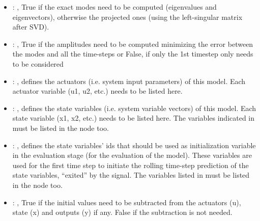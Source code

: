 \begin{itemize}
    \item {}: , 
      True if the exact modes need to be computed (eigenvalues and
      eigenvectors),   otherwise the projected ones (using the left-singular matrix after SVD).

    \item {}: , 
      True if the amplitudes need to be computed minimizing the error
      between the modes and all the time-steps or False, if only the 1st timestep only needs to be
      considered

    \item {}: , 
      defines the actuators (i.e. system input parameters)
      of this model. Each actuator variable (u1, u2, etc.) needs to
      be listed here.

    \item {}: , 
      defines the state variables (i.e. system variable vectors)
      of this model. Each state variable (x1, x2, etc.) needs to be listed
      here. The variables indicated in  must be
      listed in the  node too.

    \item {}: , 
      defines the state variables' ids  that should be used as
      initialization variable                                                   in the evaluation
      stage (for the evaluation of the model).
      These variables are used for the first time step to initiate
      the rolling time-step prediction of the state variables, ``exited''
      by the  signal. The variables listed in
       must be listed in the  
      node too.

    \item {}: , 
      True if the initial values need to be subtracted from the
      actuators (u), state (x) and outputs (y) if any. False if the subtraction
      is not needed.
  \end{itemize}

